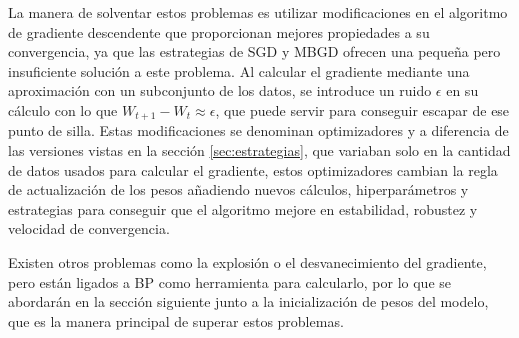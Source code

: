 La manera de solventar estos problemas es utilizar modificaciones en el algoritmo de gradiente descendente que proporcionan mejores propiedades a su convergencia, ya que las estrategias de SGD y MBGD ofrecen una pequeña pero insuficiente solución a este problema. Al calcular el gradiente mediante una aproximación con un subconjunto de los datos, se introduce un ruido $\epsilon$ en su cálculo con lo que $W_{t+1} - W_t \approx \epsilon$, que puede servir para conseguir escapar de ese punto de silla. Estas modificaciones se denominan optimizadores y a diferencia de las versiones vistas en la sección \ref{sec:estrategias}, que variaban solo en la cantidad de datos usados para calcular el gradiente, estos optimizadores cambian la regla de actualización de los pesos añadiendo nuevos cálculos, hiperparámetros y estrategias para conseguir que el algoritmo mejore en estabilidad, robustez y velocidad de convergencia.


Existen otros problemas como la explosión o el desvanecimiento del gradiente, pero están ligados a BP como herramienta para calcularlo, por lo que se abordarán en la sección siguiente junto a la inicialización de pesos del modelo, que es la manera principal de superar estos problemas.





